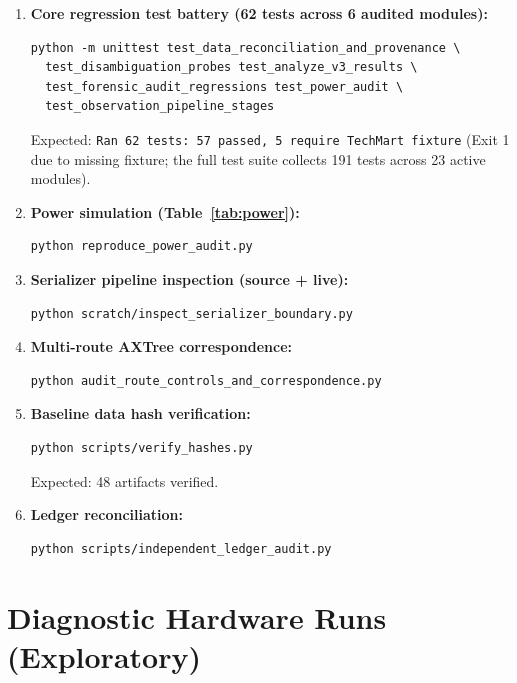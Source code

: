\documentclass[conference]{IEEEtran}
\begin{document}
\begin{enumerate}
    \item \textbf{Core regression test battery (62 tests across 6 audited modules):}
\begin{lstlisting}
python -m unittest test_data_reconciliation_and_provenance \
  test_disambiguation_probes test_analyze_v3_results \
  test_forensic_audit_regressions test_power_audit \
  test_observation_pipeline_stages
\end{lstlisting}
Expected: \texttt{Ran 62 tests: 57 passed, 5 require TechMart fixture} (Exit 1 due to missing fixture; the full test suite collects 191 tests across 23 active modules).

    \item \textbf{Power simulation (Table~\ref{tab:power}):}
\begin{lstlisting}
python reproduce_power_audit.py
\end{lstlisting}

    \item \textbf{Serializer pipeline inspection (source + live):}
\begin{lstlisting}
python scratch/inspect_serializer_boundary.py
\end{lstlisting}

    \item \textbf{Multi-route AXTree correspondence:}
\begin{lstlisting}
python audit_route_controls_and_correspondence.py
\end{lstlisting}

    \item \textbf{Baseline data hash verification:}
\begin{lstlisting}
python scripts/verify_hashes.py
\end{lstlisting}
Expected: 48 artifacts verified.

    \item \textbf{Ledger reconciliation:}
\begin{lstlisting}
python scripts/independent_ledger_audit.py
\end{lstlisting}
\end{enumerate}

\FloatBarrier

\section{Diagnostic Hardware Runs (Exploratory)}
\label{app:local_diagnostics}
\end{document}
